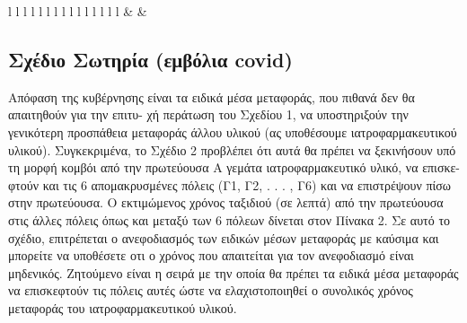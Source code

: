\documentclass[
]{article}
\begin{document}
\begin{table}[ht]
\begin{centerbox}
\begin{threeparttable}
\begin{tabular}{l l l l l l l l l l l l l l l}
 &
 &
 \tabularnewline[-0.5pt]


\end{tabular}
\end{threeparttable}\par\end{centerbox}

\end{table}
 

\hypertarget{ux3c3ux3c7ux3adux3b4ux3b9ux3bf-ux3c3ux3c9ux3c4ux3b7ux3c1ux3afux3b1-ux3b5ux3bcux3b2ux3ccux3bbux3b9ux3b1-covid}{%
\subsection{Σχέδιο Σωτηρία (εμβόλια covid)}\label{ux3c3ux3c7ux3adux3b4ux3b9ux3bf-ux3c3ux3c9ux3c4ux3b7ux3c1ux3afux3b1-ux3b5ux3bcux3b2ux3ccux3bbux3b9ux3b1-covid}}

Απόφαση της κυβέρνησης είναι τα ειδικά μέσα μεταφοράς, που πιθανά δεν θα
απαιτηθούν για την επιτυ- χή περάτωση του Σχεδίου 1, να υποστηριξούν την
γενικότερη προσπάθεια μεταφοράς άλλου υλικού (ας υποθέσουμε ιατροφαρμακευτικού
υλικού). Συγκεκριμένα, το Σχέδιο 2 προβλέπει ότι αυτά θα πρέπει να ξεκινήσουν
υπό τη μορφή κομβόι από την πρωτεύουσα Α γεμάτα ιατροφαρμακευτικό υλικό, να
επισκε- φτούν και τις 6 απομακρυσμένες πόλεις (Γ1, Γ2, . . . , Γ6) και να
επιστρέψουν πίσω στην πρωτεύουσα. Ο εκτιμώμενος χρόνος ταξιδιού (σε λεπτά) από
την πρωτεύουσα στις άλλες πόλεις όπως και μεταξύ των 6 πόλεων δίνεται στον
Πίνακα 2. Σε αυτό το σχέδιο, επιτρέπεται ο ανεφοδιασμός των ειδικών μέσων
μεταφοράς με καύσιμα και μπορείτε να υποθέσετε οτι ο χρόνος που απαιτείται για
τον ανεφοδιασμό είναι μηδενικός. Ζητούμενο είναι η σειρά με την οποία θα πρέπει
τα ειδικά μέσα μεταφοράς να επισκεφτούν τις πόλεις αυτές ώστε να ελαχιστοποιηθεί
ο συνολικός χρόνος μεταφοράς του ιατροφαρμακευτικού υλικού.
\end{document}
